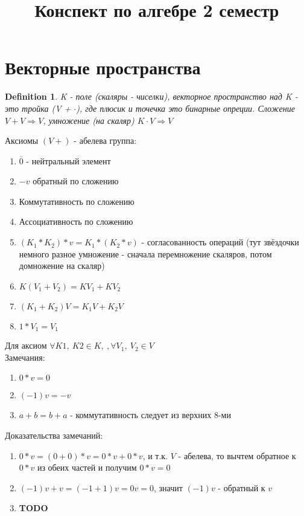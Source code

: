 \documentclass[12pt]{article}
\title{Конспект по алгебре 2 семестр}
\newtheorem{definition}{Definition}
\begin{document}
\maketitle
\section{Векторные пространства}
\begin{definition}
K - поле (скаляры - чиселки), векторное пространство над K - это тройка (V + $\cdot$), где плюсик и точечка это бинарные опреции. Сложение $V + V \Rightarrow V$, умножение (на скаляр) $K \cdot V \Rightarrow V$
\end{definition}

Аксиомы $(V +)$ - абелева группа: \begin{enumerate}
    \item $\overline{0}$ - нейтральный элемент 
    \item $-v$ обратный по сложению
    \item Коммутативность по сложению
    \item Ассоциативность по сложению
    \item $(K_1 * K_2) * v = K_1 * ( K_2 * v)$ - согласованность операций (тут звёздочки немного разное умножение - сначала перемножение скаляров, потом домножение на скаляр)
    \item $K ( V_1 + V_2) = K V_1 + K V_2$
    \item $(K_1 + K_2) V = K_1V + K_2V$
    \item $1 * V_1 = V_1$
\end{enumerate} 
Для аксиом $\forall K1,\  K2 \in K, \ , \forall V_1, \ V_2 \in V$
\\

Замечания:
\begin{enumerate}
    \item  $0 * v = 0$
    \item $(-1) v = -v$ 
    \item $a + b = b + a$ - коммутативность следует из верхних 8-ми
\end{enumerate}
Доказательства замечаний: 
\begin{enumerate}
    \item $0 * v = (0 + 0) * v = 0 * v + 0 * v$, и т.к. $V$ - абелева, то вычтем обратное к $0 * v$ из обеих частей и получим $0 * v = 0$
    \item $(-1) v + v = (-1 + 1)v = 0 v = 0$, значит $(-1)v$ - обратный к $v$
    \item \textbf{TODO}
\end{enumerate}
\\
\end{document}
